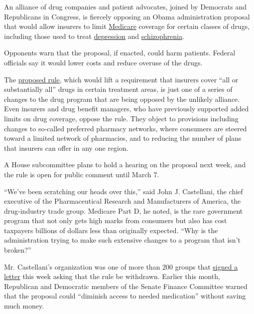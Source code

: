 An alliance of drug companies and patient advocates, joined by Democrats
and Republicans in Congress, is fiercely opposing an Obama
administration proposal that would allow insurers to limit
\href{http://topics.nytimes.com/top/news/health/diseasesconditionsandhealthtopics/medicare/index.html?inline=nyt-classifier}{Medicare}
coverage for certain classes of drugs, including those used to treat
\href{http://health.nytimes.com/health/guides/symptoms/depression/overview.html?inline=nyt-classifier}{depression}
and
\href{http://health.nytimes.com/health/guides/disease/schizophrenia-disorganized-type/overview.html?inline=nyt-classifier}{schizophrenia}.

Opponents warn that the proposal, if enacted, could harm patients.
Federal officials say it would lower costs and reduce overuse of the
drugs.

The
\href{http://www.gpo.gov/fdsys/pkg/FR-2014-01-10/pdf/2013-31497.pdf}{proposed
rule}, which would lift a requirement that insurers cover ``all or
substantially all'' drugs in certain treatment areas, is just one of a
series of changes to the drug program that are being opposed by the
unlikely alliance. Even insurers and drug benefit managers, who have
previously supported added limits on drug coverage, oppose the rule.
They object to provisions including changes to so-called preferred
pharmacy networks, where consumers are steered toward a limited network
of pharmacies, and to reducing the number of plans that insurers can
offer in any one region.

A House subcommittee plans to hold a hearing on the proposal next week,
and the rule is open for public comment until March 7.

``We've been scratching our heads over this,'' said John J. Castellani,
the chief executive of the Pharmaceutical Research and Manufacturers of
America, the drug-industry trade group. Medicare Part D, he noted, is
the rare government program that not only gets high marks from consumers
but also has cost taxpayers billions of dollars less than originally
expected. ``Why is the administration trying to make such extensive
changes to a program that isn't broken?''

Mr. Castellani's organization was one of more than 200 groups that
\href{http://www.hlc.org/blog/wp-content/uploads/2014/02/Comment-Ltr-as-of-2-19.pdf}{signed
a letter} this week asking that the rule be withdrawn. Earlier this
month, Republican and Democratic members of the Senate Finance Committee
warned that the proposal could ``diminish access to needed medication''
without saving much money.

